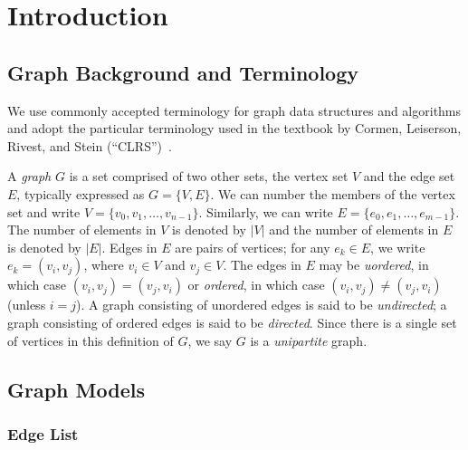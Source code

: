 
\section{Introduction}



\subsection{Graph Background and Terminology}

We use commonly accepted terminology for graph data structures and algorithms and 
adopt the particular terminology used in the textbook by
Cormen, Leiserson, Rivest, and Stein (``CLRS'')~\cite{CLRS2022}.

A \emph{graph} $G$ is a set comprised of two other sets, the vertex set $V$ and the edge set $E$, 
typically expressed as $G=\{V,E\}$.  We can number the members of the vertex set
and write $V = \{ v_0, v_1, \ldots , v_{n-1} \}$.  Similarly, we can write $E = \{ e_0, e_1, \ldots, e_{m-1} \}$.  The number of elements in $V$ is denoted by $|V|$ and the number of elements in $E$ is denoted by $|E|$.  Edges in $E$ are pairs of vertices; for any $e_k \in E$, we write $e_k = ( v_i, v_j )$, where $v_i \in V$ and $v_j\in V$.  The edges in $E$ may be \emph{uordered}, in which case $(v_i, v_j) = (v_j, v_i)$ or \emph{ordered}, in which case $(v_i, v_j) \neq (v_j, v_i)$ (unless $i = j$).
A graph consisting of unordered edges is said to be \emph{undirected}; 
a graph consisting of ordered edges is said to be \emph{directed}.  Since there is a single set of vertices in this definition of $G$, we say $G$ is a \emph{unipartite} graph.


\subsection{Graph Models}



\subsubsection{Edge List}



